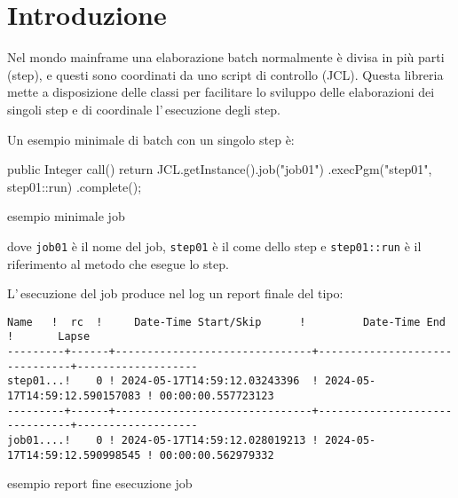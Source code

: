 \section*{Introduzione}
Nel mondo mainframe una elaborazione batch normalmente è divisa in più parti
(step), e questi sono coordinati da uno script di controllo (JCL).
Questa libreria mette a disposizione delle classi per facilitare lo sviluppo
delle elaborazioni dei singoli step e di coordinale l'\,esecuzione degli step.

Un esempio minimale di batch con un singolo step è:
\begin{elisting}[!htb]
\begin{javacode}
public Integer call() {
    return JCL.getInstance().job("job01")
        .execPgm("step01", step01::run)
        .complete();
}
\end{javacode}
\caption{esempio minimale job}
\label{lst:demoJob}
\end{elisting}
dove \texttt{job01} è il nome del job, \texttt{step01} è il come dello step e
\texttt{step01::run} è il riferimento al metodo che esegue lo step.

L'\,esecuzione del job produce nel log un report finale del tipo:
\begin{elisting}[!htb]
\begin{Verbatim}[fontsize=\small,frame=single]
   Name   !  rc  !     Date-Time Start/Skip      !         Date-Time End         !       Lapse
---------+------+-------------------------------+-------------------------------+-------------------
step01...!    0 ! 2024-05-17T14:59:12.03243396  ! 2024-05-17T14:59:12.590157083 ! 00:00:00.557723123
---------+------+-------------------------------+-------------------------------+-------------------
job01....!    0 ! 2024-05-17T14:59:12.028019213 ! 2024-05-17T14:59:12.590998545 ! 00:00:00.562979332
\end{Verbatim}
\caption{esempio report fine esecuzione job}
\label{lst:demoLog}
\end{elisting}
